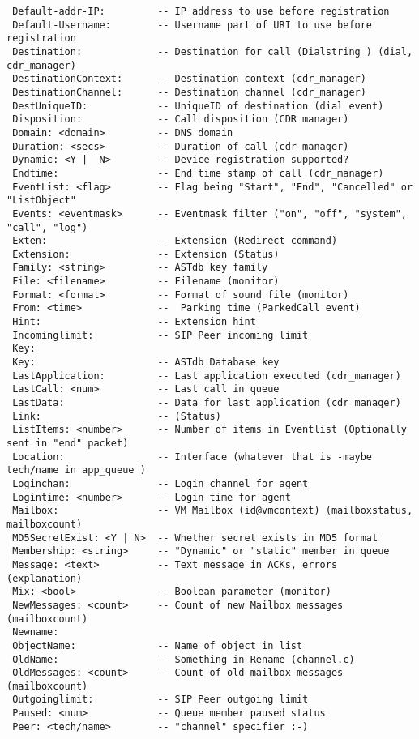 \begin{verbatim}
 Default-addr-IP:         -- IP address to use before registration
 Default-Username:        -- Username part of URI to use before registration
 Destination:             -- Destination for call (Dialstring ) (dial, cdr_manager)
 DestinationContext:      -- Destination context (cdr_manager)
 DestinationChannel:      -- Destination channel (cdr_manager)
 DestUniqueID:            -- UniqueID of destination (dial event)
 Disposition:             -- Call disposition (CDR manager)
 Domain: <domain>         -- DNS domain
 Duration: <secs>         -- Duration of call (cdr_manager)
 Dynamic: <Y |  N>        -- Device registration supported?
 Endtime:                 -- End time stamp of call (cdr_manager)
 EventList: <flag>        -- Flag being "Start", "End", "Cancelled" or "ListObject"
 Events: <eventmask>      -- Eventmask filter ("on", "off", "system", "call", "log")
 Exten:                   -- Extension (Redirect command)
 Extension:               -- Extension (Status)
 Family: <string>         -- ASTdb key family
 File: <filename>         -- Filename (monitor)
 Format: <format>         -- Format of sound file (monitor)
 From: <time>             --  Parking time (ParkedCall event)
 Hint:                    -- Extension hint
 Incominglimit:           -- SIP Peer incoming limit
 Key:
 Key:                     -- ASTdb Database key
 LastApplication:         -- Last application executed (cdr_manager)
 LastCall: <num>          -- Last call in queue
 LastData:                -- Data for last application (cdr_manager)
 Link:                    -- (Status)
 ListItems: <number>      -- Number of items in Eventlist (Optionally sent in "end" packet)
 Location:                -- Interface (whatever that is -maybe tech/name in app_queue )
 Loginchan:               -- Login channel for agent
 Logintime: <number>      -- Login time for agent
 Mailbox:                 -- VM Mailbox (id@vmcontext) (mailboxstatus, mailboxcount)
 MD5SecretExist: <Y | N>  -- Whether secret exists in MD5 format 
 Membership: <string>     -- "Dynamic" or "static" member in queue
 Message: <text>          -- Text message in ACKs, errors (explanation)
 Mix: <bool>              -- Boolean parameter (monitor) 
 NewMessages: <count>     -- Count of new Mailbox messages (mailboxcount)
 Newname:   
 ObjectName:              -- Name of object in list
 OldName:                 -- Something in Rename (channel.c)
 OldMessages: <count>     -- Count of old mailbox messages (mailboxcount) 
 Outgoinglimit:           -- SIP Peer outgoing limit
 Paused: <num>            -- Queue member paused status
 Peer: <tech/name>        -- "channel" specifier :-)

\end{verbatim}
